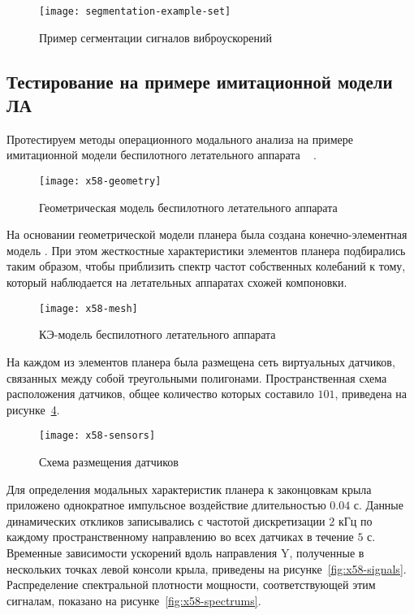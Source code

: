 \begin{figure}[!htb]
	\centerfloat
	\texttt{[image: segmentation-example-set]}
	\caption{Пример сегментации сигналов виброускорений} \label{fig:segmentation-example}
\end{figure}

\subsection{Тестирование на примере имитационной модели ЛА}

Протестируем методы операционного модального анализа на примере имитационной модели беспилотного летательного аппарата ~ \cite{lib:misc:x58}. 

\begin{figure}[H]
	\centerfloat
	\texttt{[image: x58-geometry]}
	\caption{Геометрическая модель беспилотного летательного аппарата} \label{fig:x58-geometry}
\end{figure}

На основании геометрической модели планера была создана конечно-элементная модель  . При этом жесткостные характеристики элементов планера подбирались таким образом, чтобы приблизить спектр частот собственных колебаний к тому, который наблюдается на летательных аппаратах схожей компоновки.

\begin{figure}[!htb]
	\centerfloat
	\texttt{[image: x58-mesh]}
	\caption{КЭ-модель беспилотного летательного аппарата} \label{fig:x58-mesh}
\end{figure}

На каждом из элементов планера была размещена сеть виртуальных датчиков, связанных между собой треугольными полигонами. Пространственная схема расположения датчиков, общее количество которых составило $ 101 $, приведена на рисунке~\ref{fig:x58-sensors}.

\begin{figure}[H]
	\centerfloat
	\texttt{[image: x58-sensors]}
	\caption{Схема размещения датчиков} \label{fig:x58-sensors}
\end{figure}

Для определения модальных характеристик планера к законцовкам крыла приложено однократное импульсное воздействие длительностью $ 0.04 $ с. Данные динамических откликов записывались с частотой дискретизации $ 2 $ кГц по каждому пространственному направлению во всех датчиках в течение $ 5 $ с. Временные зависимости ускорений вдоль направления Y, полученные в нескольких точках левой консоли крыла, приведены на рисунке~\ref{fig:x58-signals}. Распределение спектральной плотности мощности, соответствующей этим сигналам, показано на рисунке~\ref{fig:x58-spectrums}.

